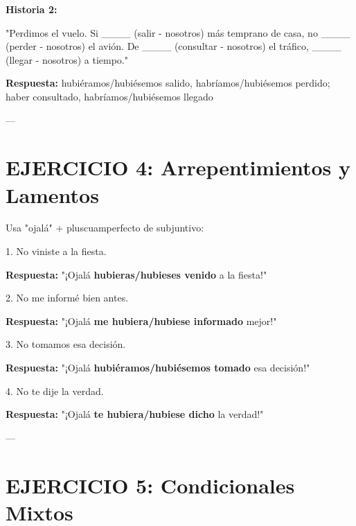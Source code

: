 \documentclass[a4paper,11pt]{article}
\begin{document}
\textbf{Historia 2:}

"Perdimos el vuelo. Si ____ (salir - nosotros) más temprano de casa, no ____ (perder - nosotros) el avión. De ____ (consultar - nosotros) el tráfico, ____ (llegar - nosotros) a tiempo."

\vspace{0.2cm}

\textbf{Respuesta:} hubiéramos/hubiésemos salido, habríamos/hubiésemos perdido; haber consultado, habríamos/hubiésemos llegado

\vspace{0.2cm}

---

\vspace{0.2cm}

\section{EJERCICIO 4: Arrepentimientos y Lamentos}

\vspace{0.2cm}

Usa "ojalá" + pluscuamperfecto de subjuntivo:

\vspace{0.2cm}

1. No viniste a la fiesta.

\textbf{Respuesta:} "¡Ojalá \textbf{hubieras/hubieses venido} a la fiesta!"

\vspace{0.2cm}

2. No me informé bien antes.

\textbf{Respuesta:} "¡Ojalá \textbf{me hubiera/hubiese informado} mejor!"

\vspace{0.2cm}

3. No tomamos esa decisión.

\textbf{Respuesta:} "¡Ojalá \textbf{hubiéramos/hubiésemos tomado} esa decisión!"

\vspace{0.2cm}

4. No te dije la verdad.

\textbf{Respuesta:} "¡Ojalá \textbf{te hubiera/hubiese dicho} la verdad!"

\vspace{0.2cm}

---

\vspace{0.2cm}

\section{EJERCICIO 5: Condicionales Mixtos}
\end{document}
